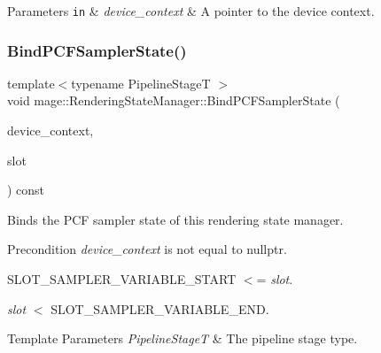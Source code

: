 \begin{DoxyParams}[1]{Parameters}
\mbox{\tt in}  & {\em device\+\_\+context} & A pointer to the device context. \\
\hline
\end{DoxyParams}
\hypertarget{classmage_1_1_rendering_state_manager_ad8d80be6bbf83e2626de777963ff62ab}{}\label{classmage_1_1_rendering_state_manager_ad8d80be6bbf83e2626de777963ff62ab} 
\subsubsection{\texorpdfstring{Bind\+P\+C\+F\+Sampler\+State()}{BindPCFSamplerState()}}
{\footnotesize\ttfamily template$<$typename Pipeline\+StageT $>$ \\
void mage\+::\+Rendering\+State\+Manager\+::\+Bind\+P\+C\+F\+Sampler\+State (\begin{DoxyParamCaption}\item[{I\+D3\+D11\+Device\+Context4 $\ast$}]{device\+\_\+context,  }\item[{\hyperlink{namespacemage_a41c104c036fba3756a74e19f793eeaa1}{U32}}]{slot }\end{DoxyParamCaption}) const\hspace{0.3cm}{\ttfamily [noexcept]}}

Binds the P\+CF sampler state of this rendering state manager.

\begin{DoxyPrecond}{Precondition}
{\itshape device\+\_\+context} is not equal to {\ttfamily nullptr}. 

{\ttfamily S\+L\+O\+T\+\_\+\+S\+A\+M\+P\+L\+E\+R\+\_\+\+V\+A\+R\+I\+A\+B\+L\+E\+\_\+\+S\+T\+A\+RT} $<$= {\itshape slot}. 

{\itshape slot} $<$ {\ttfamily S\+L\+O\+T\+\_\+\+S\+A\+M\+P\+L\+E\+R\+\_\+\+V\+A\+R\+I\+A\+B\+L\+E\+\_\+\+E\+ND}. 
\end{DoxyPrecond}

\begin{DoxyTemplParams}{Template Parameters}
{\em Pipeline\+StageT} & The pipeline stage type. \\
\hline
\end{DoxyTemplParams}

